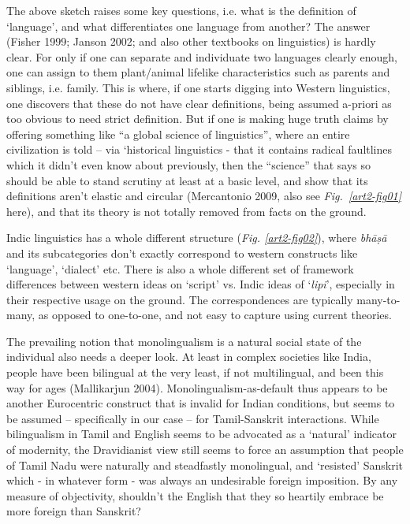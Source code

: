The above sketch raises some key questions, i.e. what is the definition of ‘language’, and what differentiates one language from another? The answer (Fisher 1999; Janson 2002; and also other textbooks on linguistics) is hardly clear. For only if one can separate and individuate two languages clearly enough, one can assign to them plant/animal lifelike characteristics such as parents and siblings, i.e. family. This is where, if one starts digging into Western linguistics, one discovers that these do not have clear definitions, being assumed a-priori as too obvious to need strict definition. But if one is making huge truth claims by offering something like “a global science of linguistics”, where an entire civilization is told – via ‘historical linguistics - that it contains radical faultlines which it didn’t even know about previously, then the “science” that says so should be able to stand scrutiny at least at a basic level, and show that its definitions aren’t elastic and circular (Mercantonio 2009, also see \textit{Fig.\ \ref{art2-fig01}} here), and that its theory is not totally removed from facts on the ground.

Indic linguistics has a whole different structure (\textit{Fig. \ref{art2-fig02}}), where \textit{bhāṣā} and its subcategories don’t exactly correspond to western constructs like ‘language’, ‘dialect’ etc. There is also a whole different set of framework differences between western ideas on ‘script’ vs. Indic ideas of ‘\textit{lipi}’, especially in their respective usage on the ground. The correspondences are typically many-to-many, as opposed to one-to-one, and not easy to capture using current theories.

The prevailing notion that monolingualism is a natural social state of the individual also needs a deeper look. At least in complex societies like India, people have been bilingual at the very least, if not multilingual, and been this way for ages (Mallikarjun 2004). Monolingualism-as-default thus appears to be another Eurocentric construct that is invalid for Indian conditions, but seems to be assumed – specifically in our case – for Tamil-Sanskrit interactions. While bilingualism in Tamil and English seems to be advocated as a ‘natural’ indicator of modernity, the Dravidianist view still seems to force an assumption that people of Tamil Nadu were naturally and steadfastly monolingual, and ‘resisted’ Sanskrit which - in whatever form - was always an undesirable foreign imposition. By any measure of objectivity, shouldn’t the English that they so heartily embrace be more foreign than Sanskrit?

